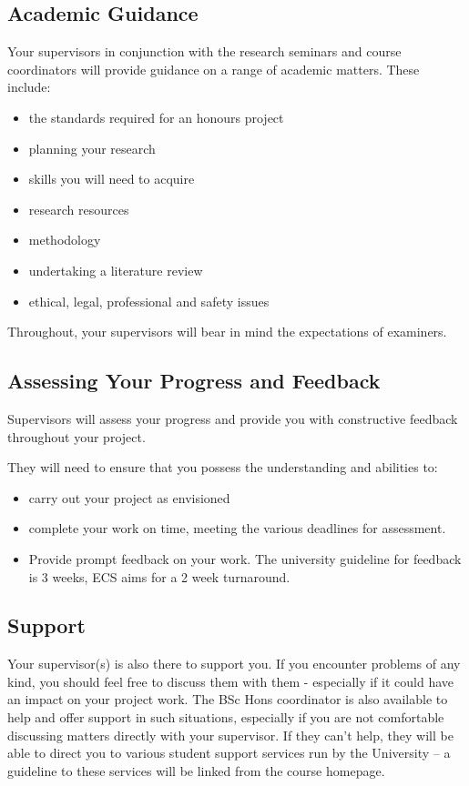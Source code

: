 \subsection{Academic Guidance}

Your supervisors in conjunction with the research seminars and course coordinators 
will provide guidance on a range of academic matters. These include:

\begin{itemize}
\item the standards required for an honours project
\item planning your research
\item skills you will need to acquire
\item research resources
\item methodology
\item undertaking a literature review
\item ethical, legal, professional and safety issues
\end{itemize}

Throughout, your supervisors will bear in mind the expectations of examiners.

\subsection{Assessing Your Progress and Feedback}

Supervisors will assess your progress and provide you with constructive 
feedback throughout your project. 

They will need to ensure that you possess the understanding and abilities to:
\begin{itemize}
\item carry out your project as envisioned
\item complete your work on time, meeting the various deadlines for assessment.
\item Provide prompt feedback on your work.  The university guideline
  for feedback is 3 weeks, ECS aims for a 2 week turnaround.
\end{itemize}

\subsection{Support}
Your supervisor(s) is also there to support you. If you encounter
problems of any kind, you should feel free to discuss them with them -
especially if it could have an impact on your project work.  The BSc Hons 
coordinator is also available to help and offer support in such
situations, especially if you are not comfortable discussing matters
directly with your supervisor.  If they can't help, they will be able
to direct you to various student support services run by the
University -- a guideline to these services will be linked from the
course homepage.

